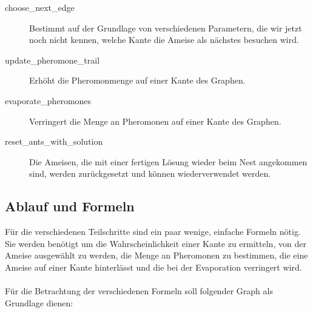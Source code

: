 \begin{description}
\item[choose\_next\_edge] Bestimmt auf der Grundlage von verschiedenen Parametern, die wir jetzt noch nicht kennen, welche Kante die Ameise als nächstes besuchen wird.
\item[update\_pheromone\_trail] Erhöht die Pheromonmenge auf einer Kante des Graphen.
\item[evaporate\_pheromones] Verringert die Menge an Pheromonen auf einer Kante des Graphen.
\item[reset\_ants\_with\_solution] Die Ameisen, die mit einer fertigen Lösung wieder beim Nest angekommen sind, werden zurückgesetzt und können wiederverwendet werden. 
\end{description}

\subsection{Ablauf und Formeln}

Für die verschiedenen Teilschritte sind ein paar wenige, einfache Formeln nötig. Sie werden benötigt um die Wahrscheinlichkeit einer Kante zu ermitteln, von der Ameise ausgewählt zu werden, die Menge an Pheromonen zu bestimmen, die eine Ameise auf einer Kante hinterlässt und die bei der Evaporation verringert wird.

\paragraph*{}
Für die Betrachtung der verschiedenen Formeln soll folgender Graph als Grundlage dienen:

\paragraph*{}

